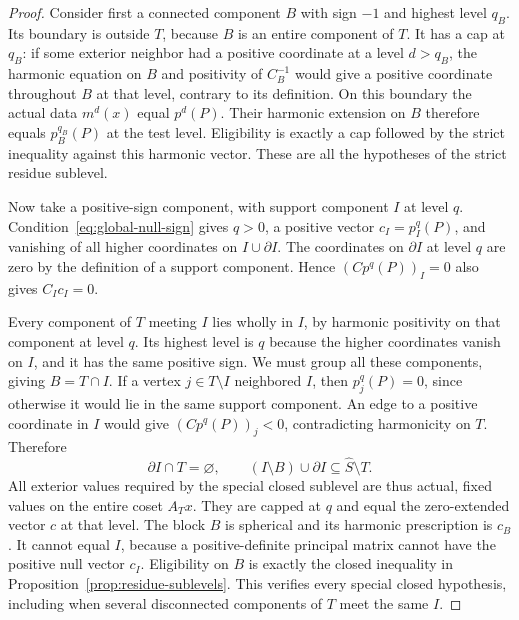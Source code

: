 \begin{proof}
Consider first a connected component $B$ with sign $-1$ and highest
level $q_B$.  Its boundary is outside $T$, because $B$ is an entire
component of $T$.  It has a cap at $q_B$: if some exterior neighbor had
a positive coordinate at a level $d>q_B$, the harmonic equation on $B$
and positivity of $C_B^{-1}$ would give a positive coordinate throughout
$B$ at that level, contrary to its definition.  On this boundary the
actual data $m^d(x)$ equal $p^d(P)$.  Their harmonic extension on $B$
therefore equals $p_B^{q_B}(P)$ at the test level.  Eligibility is
exactly a cap followed by the strict inequality against this harmonic
vector.  These are all the hypotheses of the strict residue sublevel.

Now take a positive-sign component, with support component $I$ at level
$q$.  Condition~\eqref{eq:global-null-sign} gives $q>0$, a positive
vector $c_I=p_I^q(P)$, and vanishing of all higher coordinates on
$I\cup\partial I$.  The coordinates on $\partial I$ at level $q$ are
zero by the definition of a support component.  Hence
$(Cp^q(P))_I=0$ also gives $C_Ic_I=0$.

Every component of $T$ meeting $I$ lies wholly in $I$, by harmonic
positivity on that component at level $q$.  Its highest level is $q$
because the higher coordinates vanish on $I$, and it has the same
positive sign.  We must group all these components, giving $B=T\cap I$.
If a vertex $j\in T\setminus I$ neighbored $I$, then $p_j^q(P)=0$,
since otherwise it would lie in the same support component.  An edge
to a positive coordinate in $I$ would give $(Cp^q(P))_j<0$, contradicting
harmonicity on $T$.  Therefore
\begin{equation}\label{eq:global-closed-exterior}
 \partial I\cap T=\varnothing,
 \qquad (I\setminus B)\cup\partial I
           \subseteq\widehat S\setminus T.
\end{equation}
All exterior values required by the special closed sublevel are thus
actual, fixed values on the entire coset $A_Tx$.  They are capped at
$q$ and equal the zero-extended vector $c$ at that level.  The block
$B$ is spherical and its harmonic prescription is $c_B$.
It cannot equal $I$, because a positive-definite principal matrix cannot
have the positive null vector $c_I$.  Eligibility on $B$ is exactly the
closed inequality in Proposition~\ref{prop:residue-sublevels}.  This
verifies every special closed hypothesis, including when several
disconnected components of $T$ meet the same $I$.


\end{proof}
